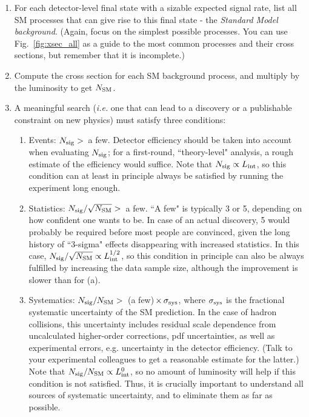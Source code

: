 \documentclass{ws-procs9x6}
\begin{document}
\begin{enumerate}
\item For each detector-level final state with a sizable expected signal rate, list all SM processes that can give rise to this final state - the {\it Standard Model background}. (Again, focus on the simplest possible processes. You can use Fig.~\ref{fig:xsec_all} as a guide to the most common processes and their cross sections, but remember that it is incomplete.)

\item Compute the cross section for each SM background process, and multiply by the luminosity to get $N_{\rm SM}$.

\item A meaningful search ({\it i.e.} one that can lead to a discovery or a publishable constraint on new physics) must satisfy three conditions:

\begin{enumerate}

\item Events: $N_{\rm sig}>$~a few. Detector efficiency should be taken into account when evaluating $N_{\rm sig}$; for a first-round, ``theory-level" analysis, a rough estimate of the efficiency would suffice. Note that $N_{\rm sig}\propto L_{\rm int}$, so this condition can at least in principle always be satisfied by running the experiment long enough.

\item Statistics: $N_{\rm sig}/\sqrt{N_{\rm SM}}>$~a few. ``A few" is typically 3 or 5, depending on how confident one wants to be. In case of an actual discovery, 5 would probably be required before most people are convinced, given the long history of ``3-sigma" effects disappearing with increased statistics. In this case, $N_{\rm sig}/\sqrt{N_{\rm SM}} \propto L_{\rm int}^{1/2}$, so this condition in principle can also be always fulfilled by increasing the data sample size, although the improvement is slower than for (a).

\item Systematics: $N_{\rm sig}/N_{\rm SM}>$~(a few)$\,\times\,\sigma_{\rm sys}$, where $\sigma_{\rm sys}$ is the fractional systematic uncertainty of the SM prediction. In the case of hadron collisions, this uncertainty includes residual scale dependence from uncalculated higher-order corrections, pdf uncertainties, as well as experimental errors, e.g. uncertainty in the detector efficiency. (Talk to your experimental colleagues to get a reasonable estimate for the latter.) Note that $N_{\rm sig}/N_{\rm SM}\propto L_{\rm int}^0$, so no amount of luminosity will help if this condition is not satisfied. Thus, it is crucially important to understand all sources of systematic uncertainty, and to eliminate them as far as possible. 


\end{enumerate}
\end{enumerate}
\end{document}
